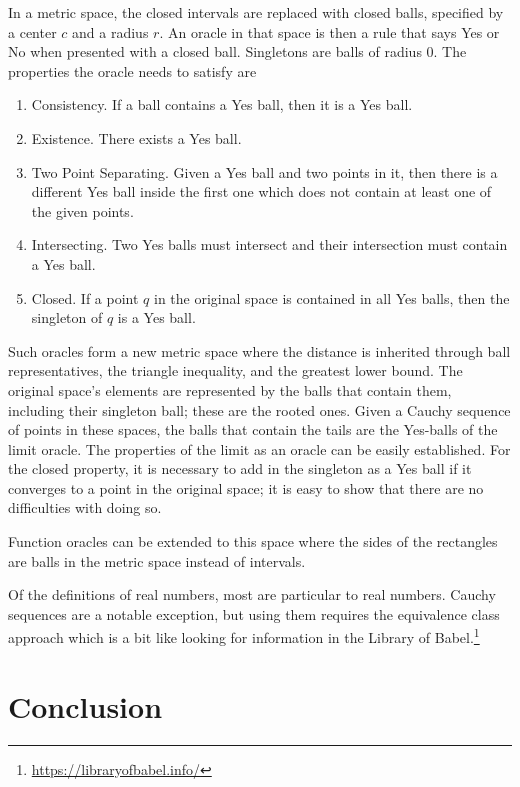 \documentclass[12pt]{article}
\theoremstyle{remark}
\begin{document}
In a metric space, the closed intervals are replaced with closed balls, specified by a center $c$ and a radius $r$. An oracle in that space is then a rule that says Yes or No when presented with a closed ball. Singletons are balls of radius $0$. The properties the oracle needs to satisfy are
\begin{enumerate}
    \item Consistency. If a ball contains a Yes ball, then it is a Yes ball. 
    \item Existence. There exists a Yes ball.
    \item Two Point Separating. Given a Yes ball and two points in it, then there is a different Yes ball inside the first one which does not contain at least one of the given points. 
    \item Intersecting. Two Yes balls must intersect and their intersection must contain a Yes ball.
    \item Closed. If a point $q$ in the original space is contained in all Yes balls, then the singleton of $q$ is a Yes ball.
\end{enumerate}

Such oracles form a new metric space where the distance is inherited through ball representatives, the triangle inequality, and the greatest lower bound. The original space's elements are represented by the balls that contain them, including their singleton ball; these are the rooted ones. Given a Cauchy sequence of points in these spaces, the balls that contain the tails are the Yes-balls of the limit oracle. The properties of the limit as an oracle can be easily established. For the closed property, it is necessary to add in the singleton as a Yes ball if it converges to a point in the original space; it is easy to show that there are no difficulties with doing so. 

Function oracles can be extended to this space where the sides of the rectangles are balls in the metric space instead of intervals. 

Of the definitions of real numbers, most are particular to real numbers. Cauchy sequences are a notable exception, but using them requires the equivalence class approach which is a bit like looking for information in the Library of Babel.\footnote{\url{https://libraryofbabel.info/}} 

\section{Conclusion}
\end{document}
